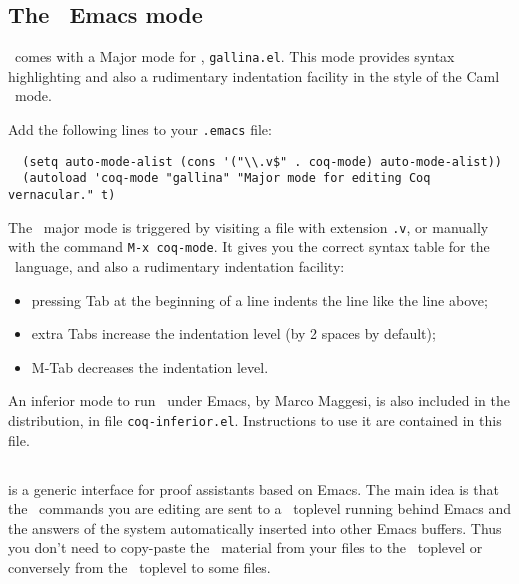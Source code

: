 \subsection{The \Coq\ Emacs mode}

\Coq\ comes with a Major mode for \emacs, {\tt gallina.el}. This mode provides
syntax highlighting
and also a rudimentary indentation facility
in the style of the Caml \emacs\ mode.

Add the following lines to your \verb!.emacs! file:

\begin{verbatim}
  (setq auto-mode-alist (cons '("\\.v$" . coq-mode) auto-mode-alist))
  (autoload 'coq-mode "gallina" "Major mode for editing Coq vernacular." t)
\end{verbatim}

The \Coq\ major mode is triggered by visiting a file with extension {\tt .v},
or manually with the command \verb!M-x coq-mode!.
It gives you the correct syntax table for
the \Coq\ language, and also a rudimentary indentation facility:
\begin{itemize}
  \item pressing {\sc Tab} at the beginning of a line indents the line like
    the line above;

  \item extra {\sc Tab}s increase the indentation level
    (by 2 spaces by default);

  \item M-{\sc Tab} decreases the indentation level.
\end{itemize}

An inferior mode to run \Coq\ under Emacs, by Marco Maggesi, is also
included in the distribution, in file \texttt{coq-inferior.el}.
Instructions to use it are contained in this file.

\subsection[{\ProofGeneral}]{{\ProofGeneral}}

{\ProofGeneral} is a generic interface for proof assistants based on
Emacs. The main idea is that the \Coq\ commands you are
editing are sent to a \Coq\ toplevel running behind Emacs and the
answers of the system automatically inserted into other Emacs buffers. 
Thus you don't need to copy-paste the \Coq\ material from your files
to the \Coq\ toplevel or conversely from the \Coq\ toplevel to some
files. 

